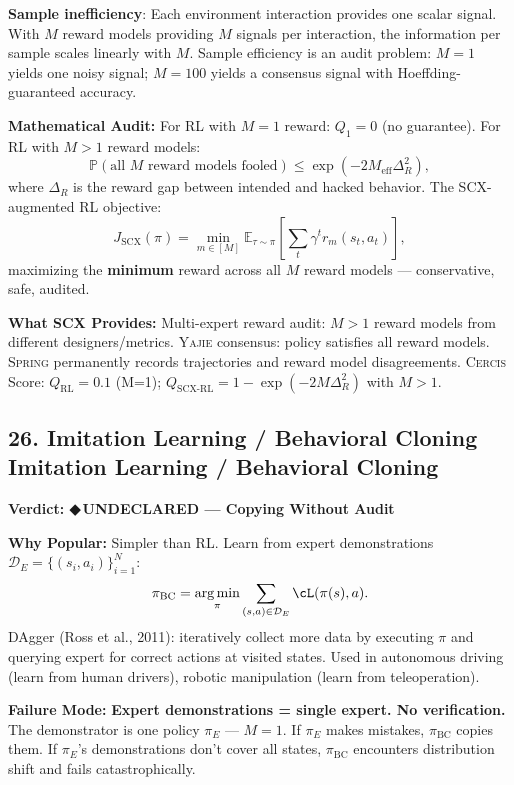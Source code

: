 \documentclass[12pt,a4paper]{article}
\theoremstyle{definition}
\newcommand{\guilty}{{\color{guiltycolor}\textbf{◆\,UNDECLARED}}}
\newcommand{\Yajie}{\textsc{Yajie}}
\newcommand{\Spring}{\textsc{Spring}}
\newcommand{\Cercis}{\textsc{Cercis}}
\DeclareMathOperator*{\argmin}{arg\,min}
\newcommand{\E}{\mathbb{E}}
\newcommand{\Pbb}{\mathbb{P}}
\newcommand{\cD}{\mathcal{D}}
\newcommand{\auditHeader}[1]{\medskip\noindent\textbf{\large #1}\medskip}
\newcommand{\whyPopular}{\noindent\textbf{Why Popular:} }
\newcommand{\whyFail}{\noindent\textbf{Failure Mode:} }
\newcommand{\whatMissing}{\noindent\textbf{What SCX Provides:} }
\newcommand{\mathAudit}{\noindent\textbf{Mathematical Audit:} }
\begin{document}
\textbf{Sample inefficiency}: Each environment interaction provides one scalar signal. With $M$ reward models providing $M$ signals per interaction, the information per sample scales linearly with $M$. Sample efficiency is an audit problem: $M=1$ yields one noisy signal; $M=100$ yields a consensus signal with Hoeffding-guaranteed accuracy.

\mathAudit{} For RL with $M=1$ reward: $Q_1 = 0$ (no guarantee). For RL with $M>1$ reward models:
\[
\Pbb(\text{all } M \text{ reward models fooled}) \le \exp(-2M_{\text{eff}}\Delta_R^2),
\]
where $\Delta_R$ is the reward gap between intended and hacked behavior. The SCX-augmented RL objective:
\[
J_{\text{SCX}}(\pi) = \min_{m \in [M]} \E_{\tau \sim \pi}\left[\sum_t \gamma^t r_m(s_t, a_t)\right],
\]
maximizing the \textbf{minimum} reward across all $M$ reward models — conservative, safe, audited.

\whatMissing{} Multi-expert reward audit: $M>1$ reward models from different designers/metrics. \Yajie{} consensus: policy satisfies all reward models. \Spring{} permanently records trajectories and reward model disagreements. \Cercis{} Score: $Q_{\text{RL}} = 0.1$ (M=1); $Q_{\text{SCX-RL}} = 1 - \exp(-2M\Delta_R^2)$ with $M>1$.

\subsection{26. Imitation Learning / Behavioral Cloning Imitation Learning / Behavioral Cloning}

\auditHeader{Verdict: \guilty{} — Copying Without Audit}

\whyPopular{} Simpler than RL. Learn from expert demonstrations $\cD_E = \{(s_i, a_i)\}_{i=1}^N$:
\[
\pi_{\text{BC}} = \argmin_\pi \sum_{(s,a) \in \cD_E} \cL(\pi(s), a).
\]
DAgger (Ross et al., 2011): iteratively collect more data by executing $\pi$ and querying expert for correct actions at visited states. Used in autonomous driving (learn from human drivers), robotic manipulation (learn from teleoperation).

\whyFail{} \textbf{Expert demonstrations = single expert. No verification.} The demonstrator is one policy $\pi_E$ — $M=1$. If $\pi_E$ makes mistakes, $\pi_{\text{BC}}$ copies them. If $\pi_E$'s demonstrations don't cover all states, $\pi_{\text{BC}}$ encounters distribution shift and fails catastrophically.
\end{document}

